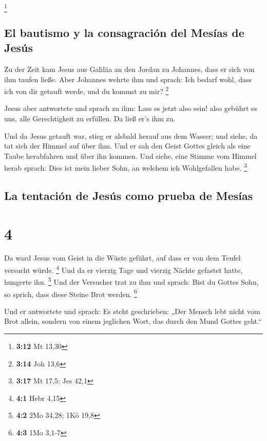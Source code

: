 \footnote{\textbf{3:12} Mt 13,30}

\hypertarget{el-bautismo-y-la-consagraciuxf3n-del-mesuxedas-de-jesuxfas}{%
\subsection{El bautismo y la consagración del Mesías de
Jesús}\label{el-bautismo-y-la-consagraciuxf3n-del-mesuxedas-de-jesuxfas}}

 Zu der Zeit kam Jesus aus Galiläa an den Jordan zu
Johannes, dass er sich von ihm taufen ließe.  Aber
Johannes wehrte ihm und sprach: Ich bedarf wohl, dass ich von dir
getauft werde, und du kommst zu mir? \footnote{\textbf{3:14} Joh 13,6}

 Jesus aber antwortete und sprach zu ihm: Lass es jetzt
also sein! also gebührt es uns, alle Gerechtigkeit zu erfüllen. Da ließ
er's ihm zu.

 Und da Jesus getauft war, stieg er alsbald herauf aus
dem Wasser; und siehe, da tat sich der Himmel auf über ihm. Und er sah
den Geist Gottes gleich als eine Taube herabfahren und über ihn kommen.
 Und siehe, eine Stimme vom Himmel herab sprach: Dies ist
mein lieber Sohn, an welchem ich Wohlgefallen habe. \footnote{\textbf{3:17}
  Mt 17,5; Jes 42,1}

\hypertarget{la-tentaciuxf3n-de-jesuxfas-como-prueba-de-mesuxedas}{%
\subsection{La tentación de Jesús como prueba de
Mesías}\label{la-tentaciuxf3n-de-jesuxfas-como-prueba-de-mesuxedas}}

\hypertarget{section-3}{%
\section{4}\label{section-3}}

 Da ward Jesus vom Geist in die Wüste geführt, auf dass er
von dem Teufel versucht würde. \footnote{\textbf{4:1} Hebr 4,15}
 Und da er vierzig Tage und vierzig Nächte gefastet hatte,
hungerte ihn. \footnote{\textbf{4:2} 2Mo 34,28; 1Kö 19,8} 
Und der Versucher trat zu ihm und sprach: Bist du Gottes Sohn, so
sprich, dass diese Steine Brot werden. \footnote{\textbf{4:3} 1Mo 3,1-7}

 Und er antwortete und sprach: Es steht geschrieben: „Der
Mensch lebt nicht vom Brot allein, sondern von einem jeglichen Wort, das
durch den Mund Gottes geht.``

